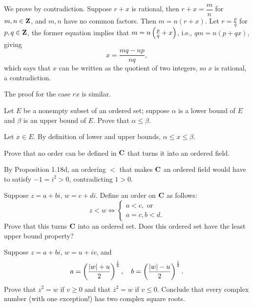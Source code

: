 \begin{solution}
We prove by contradiction. Suppose $r+x$ is rational, then $r+x=\dfrac{m}{n}$ for $m,n\in\mathbf Z$, and $m,n$ have no common factors. Then $m=n(r+x)$. Let $r=\frac{p}{q}$ for $p,q\in\mathbf Z$, the former equation implies that $m=n\left(\frac{p}{q}+x\right)$, i.e., $qm=n(p+qx)$, giving
\[x=\frac{mq-np}{nq},\]
which says that $x$ can be written as the quotient of two integers, so $x$ is rational, a contradiction.

The proof for the case $rx$ is similar.
\end{solution}

\begin{prbm}
Let $E$ be a nonempty subset of an ordered set; suppose $\alpha$ is a lower bound of $E$ and $\beta$ is an upper bound of $E$. Prove that $\alpha\le\beta$.
\end{prbm}

\begin{solution}
Let $x\in E$. By definition of lower and upper bounds, $\alpha\le x\le\beta$.
\end{solution}

\begin{prbm}
Prove that no order can be defined in $\mathbf C$ that turns it into an ordered field.
\end{prbm}

\begin{solution}
By Proposition 1.18d, an ordering $<$ that makes $\mathbf C$ an ordered field would have to satisfy $-1=i^2>0$, contradicting $1>0$.
\end{solution}

\begin{prbm}
Suppose $z=a+bi$, $w=c+di$. Define an order on $\mathbf C$ as follows:
\[z<w\iff\begin{cases}
a<c,\text{ or}\\
a=c,b<d.
\end{cases}\]
Prove that this turns $\mathbf C$ into an ordered set. Does this ordered set have the least upper bound property?
\end{prbm}

\begin{prbm}
Suppose $z=a+bi$, $w=u+iv$, and
\[a=\left(\frac{|w|+u}{2}\right)^\frac{1}{2},\quad b=\left(\frac{|w|-u}{2}\right)^\frac{1}{2}.\]
Prove that $z^2=w$ if $v\ge0$ and that $\overline{z}^2=w$ if $v\le0$. Conclude that every complex number (with one exception!) has two complex square roots.
\end{prbm}

